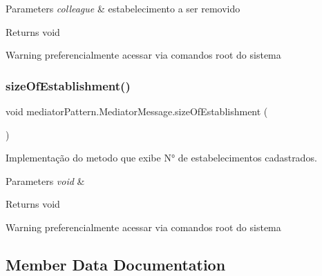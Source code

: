 \begin{DoxyParams}{Parameters}
{\em colleague} & estabelecimento a ser removido \\
\hline
\end{DoxyParams}
\begin{DoxyReturn}{Returns}
void 
\end{DoxyReturn}
\begin{DoxyWarning}{Warning}
preferencialmente acessar via comandos root do sistema 
\end{DoxyWarning}
\mbox{\label{classmediator_pattern_1_1_mediator_message_a2c346974e11a4d9e5d6d7322dfd86d62}} 
\subsubsection{\texorpdfstring{sizeOfEstablishment()}{sizeOfEstablishment()}}
{\footnotesize\ttfamily void mediator\+Pattern.\+Mediator\+Message.\+size\+Of\+Establishment (\begin{DoxyParamCaption}{ }\end{DoxyParamCaption})}



Implementação do metodo que exibe N° de estabelecimentos cadastrados. 


\begin{DoxyParams}{Parameters}
{\em void} & \\
\hline
\end{DoxyParams}
\begin{DoxyReturn}{Returns}
void 
\end{DoxyReturn}
\begin{DoxyWarning}{Warning}
preferencialmente acessar via comandos root do sistema 
\end{DoxyWarning}


\subsection{Member Data Documentation}
\mbox{\label{classmediator_pattern_1_1_mediator_message_a24221c0b2cec8ec1956163ddb1d93a14}} 
